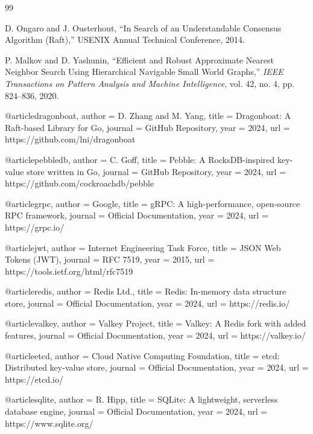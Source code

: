 
\begin{thebibliography}{99}

 D. Ongaro and J. Ousterhout, ``In Search of an Understandable Consensus Algorithm (Raft),'' USENIX Annual Technical Conference, 2014.

 P. Malkov and D. Yashunin, ``Efficient and Robust Approximate Nearest Neighbor Search Using Hierarchical Navigable Small World Graphs,'' \textit{IEEE Transactions on Pattern Analysis and Machine Intelligence}, vol. 42, no. 4, pp. 824–836, 2020.

@article{dragonboat,
  author = {D. Zhang and M. Yang},
  title = {Dragonboat: A Raft-based Library for Go},
  journal = {GitHub Repository},
  year = {2024},
  url = {https://github.com/lni/dragonboat}
}

@article{pebbledb,
  author = {C. Goff},
  title = {Pebble: A RocksDB-inspired key-value store written in Go},
  journal = {GitHub Repository},
  year = {2024},
  url = {https://github.com/cockroachdb/pebble}
}

@article{grpc,
  author = {Google},
  title = {gRPC: A high-performance, open-source RPC framework},
  journal = {Official Documentation},
  year = {2024},
  url = {https://grpc.io/}
}

@article{jwt,
  author = {Internet Engineering Task Force},
  title = {JSON Web Tokens (JWT)},
  journal = {RFC 7519},
  year = {2015},
  url = {https://tools.ietf.org/html/rfc7519}
}

@article{redis,
  author = {Redis Ltd.},
  title = {Redis: In-memory data structure store},
  journal = {Official Documentation},
  year = {2024},
  url = {https://redis.io/}
}

@article{valkey,
  author = {Valkey Project},
  title = {Valkey: A Redis fork with added features},
  journal = {Official Documentation},
  year = {2024},
  url = {https://valkey.io/}
}

@article{etcd,
  author = {Cloud Native Computing Foundation},
  title = {etcd: Distributed key-value store},
  journal = {Official Documentation},
  year = {2024},
  url = {https://etcd.io/}
}

@article{sqlite,
  author = {R. Hipp},
  title = {SQLite: A lightweight, serverless database engine},
  journal = {Official Documentation},
  year = {2024},
  url = {https://www.sqlite.org/}
}


\end{thebibliography}
